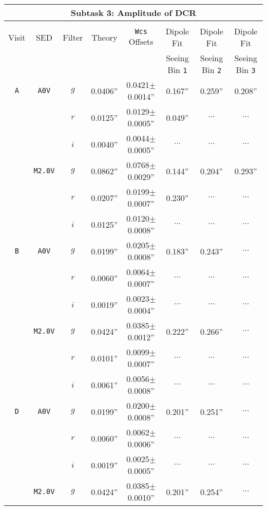 \documentclass[prd, nofootinbib, floatfix, 11pt, tightenlines, times]{article}
\def\A{{\tt A}}
\def\B{{\tt B}}
\def\D{{\tt D}}
\begin{document}
\begin{table}
\centering
\begin{tabular}{cccccccc}
\hline
\multicolumn{8}{|c|}{Subtask 3: Amplitude of DCR} \\ \hline \\
Visit    & SED & Filter & Theory & {\tt Wcs} Offsets & Dipole Fit         & Dipole Fit         & Dipole Fit \\
         &     &        &        &                   & Seeing Bin {\tt 1} & Seeing Bin {\tt 2} & Seeing Bin {\tt 3} \\
\hline
\A & {\tt A0V}   & $g$ & 0.0406'' & 0.0421$\pm$0.0014'' & 0.167''  & 0.259''  & 0.208''  \\
   &             & $r$ & 0.0125'' & 0.0129$\pm$0.0005'' & 0.049''  & $\cdots$ & $\cdots$ \\
   &             & $i$ & 0.0040'' & 0.0044$\pm$0.0005'' & $\cdots$ & $\cdots$ & $\cdots$ \\
   & {\tt M2.0V} & $g$ & 0.0862'' & 0.0768$\pm$0.0029'' & 0.144''  & 0.204''  & 0.293''  \\
   &             & $r$ & 0.0207'' & 0.0199$\pm$0.0007'' & 0.230''  & $\cdots$ & $\cdots$ \\
   &             & $i$ & 0.0125'' & 0.0120$\pm$0.0008'' & $\cdots$ & $\cdots$ & $\cdots$ \\
\hline
\B & {\tt A0V}   & $g$ & 0.0199'' & 0.0205$\pm$0.0008'' & 0.183''  & 0.243''  & $\cdots$ \\
   &             & $r$ & 0.0060'' & 0.0064$\pm$0.0007'' & $\cdots$ & $\cdots$ & $\cdots$ \\
   &             & $i$ & 0.0019'' & 0.0023$\pm$0.0004'' & $\cdots$ & $\cdots$ & $\cdots$ \\
   & {\tt M2.0V} & $g$ & 0.0424'' & 0.0385$\pm$0.0012'' & 0.222''  & 0.266''  & $\cdots$ \\
   &             & $r$ & 0.0101'' & 0.0099$\pm$0.0007'' & $\cdots$ & $\cdots$ & $\cdots$ \\
   &             & $i$ & 0.0061'' & 0.0056$\pm$0.0008'' & $\cdots$ & $\cdots$ & $\cdots$ \\
\hline
\D & {\tt A0V}   & $g$ & 0.0199'' & 0.0200$\pm$0.0008'' & 0.201''  & 0.251''  & $\cdots$ \\
   &             & $r$ & 0.0060'' & 0.0062$\pm$0.0006'' & $\cdots$ & $\cdots$ & $\cdots$ \\
   &             & $i$ & 0.0019'' & 0.0025$\pm$0.0005'' & $\cdots$ & $\cdots$ & $\cdots$ \\
   & {\tt M2.0V} & $g$ & 0.0424'' & 0.0385$\pm$0.0010'' & 0.201''  & 0.254''  & $\cdots$ \\

\end{tabular}
\end{table}
\end{document}
